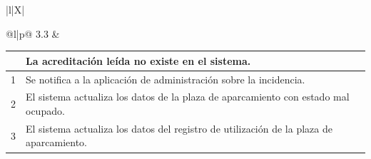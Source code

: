 \begin{tabularx}{\textwidth}{|l|X|}
{\begin{tabular}{@{}l|p{\anchoColumna{}}@{}}
			3.3 & {\begin{tabular}{@{}l|p{\anchoColumnaInterior{}}@{}}
					& La acreditación leída no existe en el sistema. \\ \hline
					1 & Se notifica a la aplicación de administración sobre la incidencia. \\ \hline
					2 & El sistema actualiza los datos de la plaza de aparcamiento con estado mal ocupado. \\ \hline
					3 & El sistema actualiza los datos del registro de utilización de la plaza de aparcamiento. \\
			\end{tabular}}
	\end{tabular}} \\ \hline
\end{tabularx}

